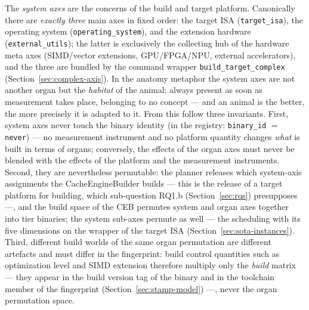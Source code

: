 \begin{nurlang}
The \emph{system axes} are the concerns of the build and target platform. Canonically there are \emph{exactly
three} main axes in fixed order: the target ISA (\texttt{target\_isa}), the operating system
(\texttt{operating\_system}), and the extension hardware (\texttt{external\_utils}); the latter is
exclusively the collecting hub of the hardware meta axes (SIMD/vector extensions, GPU/FPGA/NPU,
external accelerators), and the three are bundled by the command wrapper
\texttt{build\_target\_complex} (Section~\ref{sec:complex-axis}). In the anatomy metaphor the
system axes are not another organ but the \emph{habitat} of the animal: always present as soon as
measurement takes place, belonging to no concept --- and an animal is the better, the more precisely it is adapted to
it. From this follow three invariants. First, system axes never touch the binary identity
(in the registry: \texttt{binary\_id} $=$ \texttt{never}) --- no measurement instrument and no platform quantity
changes \emph{what} is built in terms of organs; conversely, the effects of the organ axes must never be blended with the
effects of the platform and the measurement instruments. Second, they are nevertheless
permutable: the planner releases which system-axis assignments the CacheEngineBuilder builds ---
this is the release of a target platform for building, which sub-question RQ1.b (Section~\ref{sec:rqs})
presupposes ---, and
the build space of the CEB permutes system and organ axes together into tier binaries; the
system sub-axes permute as well --- the scheduling with its five dimensions on the wrapper of the target ISA
(Section~\ref{sec:sota-instances}). Third, different build worlds of the same
organ permutation are different artefacts and must differ in the fingerprint: build control quantities
such as optimization level and SIMD extension therefore multiply only the \emph{build} matrix --- they
appear in the build version tag of the binary and in the toolchain member of the fingerprint
(Section~\ref{sec:stamp-model}) ---, never the organ permutation space.
\end{nurlang}
